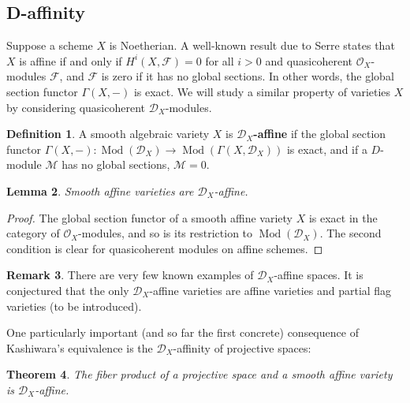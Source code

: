 \documentclass[11pt, a4paper]{article}
\newtheorem{theorem}{Theorem}[subsection]
\newtheorem{lemma}[theorem]{Lemma}
\theoremstyle{definition}
\newtheorem{remark}[theorem]{Remark}
\newtheorem{definition}[theorem]{Definition}
\newcommand{\Mod}{\operatorname{Mod}}
\begin{document}
    \subsection{D-affinity}
    Suppose a scheme $X$ is Noetherian. A well-known result due to Serre states that $X$ is affine if and only if $H^i(X,\mathcal F)=0$ for all $i>0$ and quasicoherent $\mathcal O_X$-modules $\mathcal F$, and $\mathcal F$ is zero if it has no global sections. In other words, the global section functor $\Gamma(X, -)$ is exact. We will study a similar property of varieties $X$ by considering quasicoherent $\mathcal D_X$-modules.
    \begin{definition}
        A smooth algebraic variety $X$ is \textbf{$\mathcal D_X$-affine} if the global section functor $\Gamma(X,-):\Mod(\mathcal D_X)\to\Mod(\Gamma(X, \mathcal D_X))$ is exact, and if a $D$-module $\mathcal M$ has no global sections, $\mathcal M=0$.
    \end{definition}
    \begin{lemma}
        Smooth affine varieties are $\mathcal D_X$-affine.
    \end{lemma}
    \begin{proof}
        The global section functor of a smooth affine variety $X$ is exact in the category of $\mathcal O_X$-modules, and so is its restriction to $\Mod(\mathcal D_X)$. The second condition is clear for quasicoherent modules on affine schemes.
    \end{proof}
    \begin{remark}
        There are very few known examples of $\mathcal D_X$-affine spaces. It is conjectured that the only $\mathcal D_X$-affine varieties are affine varieties and partial flag varieties (to be introduced).
    \end{remark}
    One particularly important (and so far the first concrete) consequence of Kashiwara's equivalence is the $\mathcal D_X$-affinity of projective spaces:
    \begin{theorem}
        The fiber product of a projective space and a smooth affine variety is $\mathcal D_X$-affine.
    \end{theorem}
\end{document}
